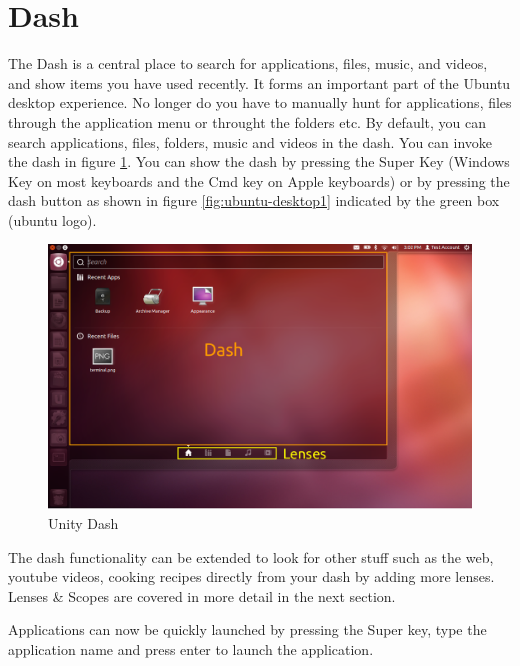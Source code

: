 \section{Dash} \label{sect:dash} 
The Dash is a central place to search for applications, files, music, and videos, and show items you have used recently. It forms an important part of the Ubuntu desktop experience. No longer do you have to manually hunt for applications, files through the application menu or throught the folders etc. By default, you can search applications, files, folders, music and videos in the dash.  You can invoke the dash in figure \ref{fig:unity-dash}. You can show the dash by pressing the Super Key (Windows Key on most keyboards and the Cmd key on Apple keyboards) or by pressing the dash button as shown in figure \ref{fig:ubuntu-desktop1} indicated by the green box (ubuntu logo).\\

\begin{figure}[h]	
	\centering
	\includegraphics[width=400pt]{./images/desktop/dash.png}
	\caption{Unity Dash}	
	\label{fig:unity-dash}	
\end{figure}

\par \noindent The dash functionality can be extended to look for other stuff such as the web, youtube videos, cooking recipes directly from your dash by adding more lenses. Lenses \& Scopes are covered in more detail in the next section.  \\

\par \noindent Applications can now be quickly launched by pressing the Super key, type the application name and press enter to launch the application. \\

